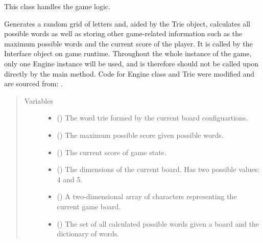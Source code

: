 \documentclass[letterpaper,10pt,english]{sphinxmanual}
\begin{document}
\begin{fulllineitems}
This class handles the game logic.

Generates a random grid of letters and, aided by the Trie object, calculates all
possible words as well as storing other game-related information such as the maximum possible words
and the current score of the player. It is called by the Interface object on game runtime.
Throughout the whole instance of the game, only one Engine instance will be used, and is
therefore should not be called upon directly by the main method. Code for Engine class
and Trie were modified and are sourced from: .
\begin{quote}\begin{description}
\item[{Variables}] \leavevmode\begin{itemize}
\item {} 
 () \textendash{} The word trie formed by the current board configuartions.

\item {} 
 () \textendash{} The maximum possible score given possible words.

\item {} 
 () \textendash{} The current score of game state.

\item {} 
 () \textendash{} The dimensions of the current board. Has two possible values: 4 and 5.

\item {} 
 () \textendash{} A two-dimensional array of characters representing the current game board.

\item {} 
 () \textendash{} The set of all calculated possible words given a board and the dictionary of words.


\end{itemize}
\end{description}
\end{quote}
\end{fulllineitems}
\end{document}
